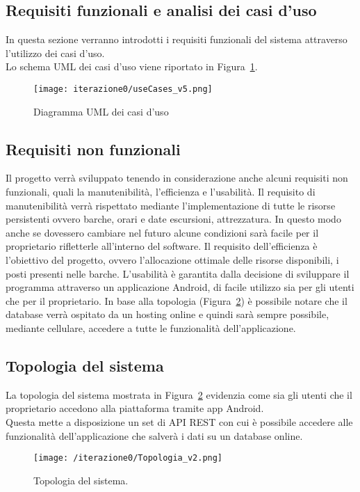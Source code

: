 \subsection{Requisiti funzionali e analisi dei casi d'uso}

In questa sezione verranno introdotti i requisiti funzionali del sistema attraverso l'utilizzo dei casi d'uso.
\\Lo schema UML dei casi d'uso viene riportato in Figura~\ref{fig:casiduso}.

\begin{figure}[htbp]
    \texttt{[image: iterazione0/useCases\_v5.png]}
    \centering
    \caption{Diagramma UML dei casi d'uso}\label{fig:casiduso}
\end{figure}

\subsection{Requisiti non funzionali}
Il progetto verrà sviluppato tenendo in considerazione anche alcuni requisiti non funzionali, quali la manutenibilità, l'efficienza e l'usabilità.
Il requisito di manutenibilità verrà rispettato mediante l'implementazione di tutte le risorse persistenti ovvero barche, orari e date escursioni, attrezzatura. In questo modo anche se dovessero cambiare nel futuro alcune condizioni sarà facile per il proprietario rifletterle all'interno del software.
Il requisito dell'efficienza è l'obiettivo del progetto, ovvero l'allocazione ottimale delle risorse disponibili, i posti presenti nelle barche.
L'usabilità è garantita dalla decisione di sviluppare il programma attraverso un applicazione Android, di facile utilizzo sia per gli utenti che per il proprietario. In base alla topologia (Figura~\ref{fig:topologia}) è possibile notare che il database verrà ospitato da un hosting online e quindi sarà sempre possibile, mediante cellulare, accedere a tutte le funzionalità dell'applicazione.

\newpage

\subsection{Topologia del sistema}
La topologia  del sistema mostrata in Figura~\ref{fig:topologia} evidenzia come sia gli utenti che il proprietario accedono alla piattaforma tramite app Android.
\\Questa mette a disposizione un set di API REST con cui è possibile accedere alle funzionalità dell'applicazione che salverà i dati su un database online.

\begin{figure}[htbp]
    \texttt{[image: /iterazione0/Topologia\_v2.png]}
    \centering
    \caption{Topologia del sistema.}\label{fig:topologia}
\end{figure}
